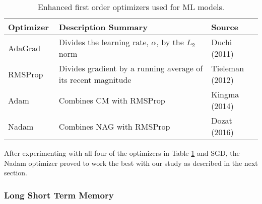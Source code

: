 %
\begin{table}[H]
\centering
\caption{Enhanced first order optimizers used for ML models.}
\label{tb-optimizers}
\begin{tabular}{@{}p{0.2\linewidth}p{0.6\linewidth}p{0.2\linewidth}@{}}
\toprule
\textbf{Optimizer} & \textbf{Description Summary} & \textbf{Source} \\ \midrule
AdaGrad & Divides the learning rate, $\alpha$, by the $L_{2}$ norm & Duchi (2011) \\
RMSProp & Divides gradient by a running average of its recent magnitude & Tieleman (2012) \\
Adam & Combines CM with RMSProp & Kingma (2014) \\
Nadam & Combines NAG with RMSProp & Dozat (2016) \\ \bottomrule
\end{tabular}
\end{table}    

%
After experimenting with all four of the optimizers in Table \ref{tb-optimizers} and SGD, the Nadam optimizer proved to work the best with our study as described in the next section.

\subsubsection{Long Short Term Memory}

